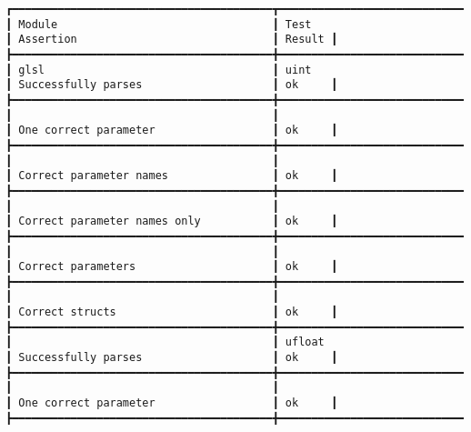 \documentclass[12pt,twoside,notitlepage]{report}
\begin{document}
\begin{listing}[H]
\begin{verbatim}
┏━━━━━━━━━━━━━━━━━━━━━━━━━━━━━━━━━━━━━━━━┳━━━━━━━━━━━━━━━━━━━━━━━━━━━━━━━━━━━━━━━━┳━━━━━━━━━━━━━━━━━━━━━━━━━━━━━━━━━━━━━━━━┳━━━━━━━━┓
┃ Module                                 ┃ Test                                   ┃ Assertion                              ┃ Result ┃
┣━━━━━━━━━━━━━━━━━━━━━━━━━━━━━━━━━━━━━━━━╋━━━━━━━━━━━━━━━━━━━━━━━━━━━━━━━━━━━━━━━━╋━━━━━━━━━━━━━━━━━━━━━━━━━━━━━━━━━━━━━━━━╋━━━━━━━━┫
┃ glsl                                   ┃ uint                                   ┃ Successfully parses                    ┃ ok     ┃
┣━━━━━━━━━━━━━━━━━━━━━━━━━━━━━━━━━━━━━━━━╋━━━━━━━━━━━━━━━━━━━━━━━━━━━━━━━━━━━━━━━━╋━━━━━━━━━━━━━━━━━━━━━━━━━━━━━━━━━━━━━━━━╋━━━━━━━━┫
┃                                        ┃                                        ┃ One correct parameter                  ┃ ok     ┃
┣━━━━━━━━━━━━━━━━━━━━━━━━━━━━━━━━━━━━━━━━╋━━━━━━━━━━━━━━━━━━━━━━━━━━━━━━━━━━━━━━━━╋━━━━━━━━━━━━━━━━━━━━━━━━━━━━━━━━━━━━━━━━╋━━━━━━━━┫
┃                                        ┃                                        ┃ Correct parameter names                ┃ ok     ┃
┣━━━━━━━━━━━━━━━━━━━━━━━━━━━━━━━━━━━━━━━━╋━━━━━━━━━━━━━━━━━━━━━━━━━━━━━━━━━━━━━━━━╋━━━━━━━━━━━━━━━━━━━━━━━━━━━━━━━━━━━━━━━━╋━━━━━━━━┫
┃                                        ┃                                        ┃ Correct parameter names only           ┃ ok     ┃
┣━━━━━━━━━━━━━━━━━━━━━━━━━━━━━━━━━━━━━━━━╋━━━━━━━━━━━━━━━━━━━━━━━━━━━━━━━━━━━━━━━━╋━━━━━━━━━━━━━━━━━━━━━━━━━━━━━━━━━━━━━━━━╋━━━━━━━━┫
┃                                        ┃                                        ┃ Correct parameters                     ┃ ok     ┃
┣━━━━━━━━━━━━━━━━━━━━━━━━━━━━━━━━━━━━━━━━╋━━━━━━━━━━━━━━━━━━━━━━━━━━━━━━━━━━━━━━━━╋━━━━━━━━━━━━━━━━━━━━━━━━━━━━━━━━━━━━━━━━╋━━━━━━━━┫
┃                                        ┃                                        ┃ Correct structs                        ┃ ok     ┃
┣━━━━━━━━━━━━━━━━━━━━━━━━━━━━━━━━━━━━━━━━╋━━━━━━━━━━━━━━━━━━━━━━━━━━━━━━━━━━━━━━━━╋━━━━━━━━━━━━━━━━━━━━━━━━━━━━━━━━━━━━━━━━╋━━━━━━━━┫
┃                                        ┃ ufloat                                 ┃ Successfully parses                    ┃ ok     ┃
┣━━━━━━━━━━━━━━━━━━━━━━━━━━━━━━━━━━━━━━━━╋━━━━━━━━━━━━━━━━━━━━━━━━━━━━━━━━━━━━━━━━╋━━━━━━━━━━━━━━━━━━━━━━━━━━━━━━━━━━━━━━━━╋━━━━━━━━┫
┃                                        ┃                                        ┃ One correct parameter                  ┃ ok     ┃
┣━━━━━━━━━━━━━━━━━━━━━━━━━━━━━━━━━━━━━━━━╋━━━━━━━━━━━━━━━━━━━━━━━━━━━━━━━━━━━━━━━━╋━━━━━━━━━━━━━━━━━━━━━━━━━━━━━━━━━━━━━━━━╋━━━━━━━━┫

\end{verbatim}
\end{listing}
\end{document}

